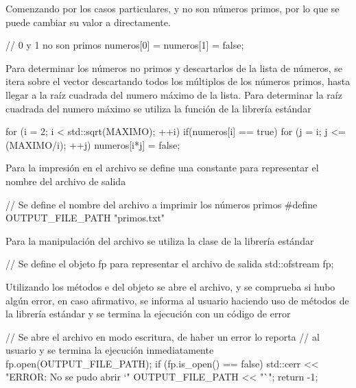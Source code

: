 \documentclass[12pt]{article}
\newenvironment{fullgrayverb}
{\verbbox}
{\endverbbox\par\colorbox{gray!25}{\parbox{\textwidth}{\theverbbox}}\par}
\begin{document}
Comenzando por los casos particulares,  y  no son números
primos, por lo que se puede cambiar su valor a  directamente.

\begin{fullgrayverb}[\mbox{}]
// 0 y 1 no son primos
numeros[0] = numeros[1] = false;
\end{fullgrayverb}

Para determinar los números no primos y descartarlos de la lista de números, se
itera sobre el vector descartando todos los múltiplos de los números primos,
hasta llegar a la raíz cuadrada del numero máximo de la lista. Para determinar
la raíz cuadrada del numero máximo se utiliza la función
 de la librería estándar  

\begin{fullgrayverb}[\mbox{}]
for (i = 2; i < std::sqrt(MAXIMO); ++i) {
    if(numeros[i] == true) {
        for (j = i; j <= (MAXIMO/i); ++j) {
            numeros[i*j] = false;
        }
    }
}
\end{fullgrayverb}

\pagebreak
Para la impresión en el archivo se define una constante para representar el
nombre del archivo de salida

\begin{fullgrayverb}[\mbox{}]
// Se define el nombre del archivo a imprimir los números primos
#define OUTPUT_FILE_PATH "primos.txt"
\end{fullgrayverb}

Para la manipulación del archivo se utiliza la clase  de la
librería estándar 

\begin{fullgrayverb}[\mbox{}]
// Se define el objeto fp para representar el archivo de salida
std::ofstream fp;
\end{fullgrayverb}

Utilizando los métodos  e  del objeto  se abre
el archivo, y se comprueba si hubo algún error, en caso afirmativo, se informa
al usuario haciendo uso de métodos de la librería estándar  y se
termina la ejecución con un código de error 

\begin{fullgrayverb}[\mbox{}]
// Se abre el archivo en modo escritura, de haber un error lo reporta
// al usuario y se termina la ejecución inmediatamente
fp.open(OUTPUT_FILE_PATH);
if (fp.is_open() == false) {
    std::cerr << "ERROR: No se pudo abrir `" OUTPUT_FILE_PATH << "`\n";
    return -1;
}
\end{fullgrayverb}
\end{document}
